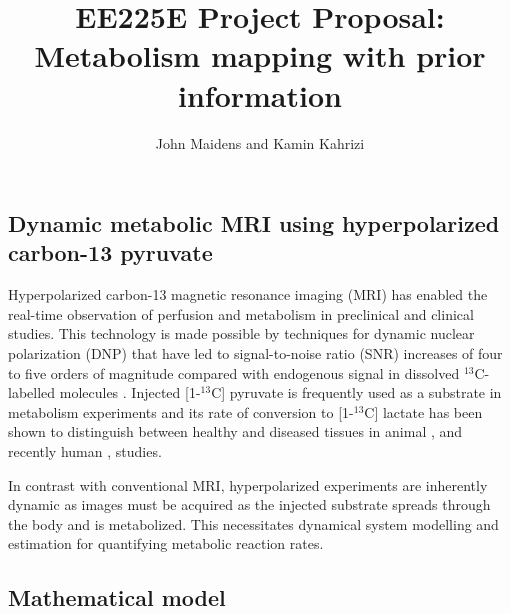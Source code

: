 \documentclass{article}
\begin{document}
\title{EE225E Project Proposal: \\
Metabolism mapping with prior information 
}
\author{John Maidens and Kamin Kahrizi}

\maketitle


\subsection{Dynamic metabolic MRI using hyperpolarized carbon-13 pyruvate}


Hyperpolarized carbon-13 magnetic resonance imaging (MRI) has enabled the real-time observation of perfusion and metabolism in preclinical and clinical studies. \cite{Golman06, Day07, Kazan13, Nelson13, Bahrami14, Swisher14}
This technology is made possible by techniques for dynamic nuclear polarization (DNP) that have led to signal-to-noise ratio (SNR) increases of four to five orders of magnitude compared with endogenous signal in dissolved $^{13}$C-labelled molecules  \cite{Ardenkjaer-Larsen03, Golman03}.  Injected [1-$^{13}$C] pyruvate is frequently used as a substrate in metabolism experiments and its rate of conversion to  [1-$^{13}$C] lactate has been shown to distinguish between healthy and diseased tissues in animal \cite{Day07}, and recently human \cite{Nelson13}, studies. 

In contrast with conventional MRI, hyperpolarized experiments are inherently dynamic as images must be acquired as the injected substrate spreads through the body and is metabolized. This necessitates dynamical system modelling and estimation for quantifying metabolic reaction rates. 

\subsection{Mathematical model} 
\end{document}
